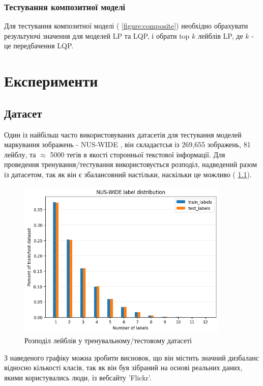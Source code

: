 \documentclass{udstu}
\begin{document}
\subsection{Тестування композитної моделі}

Для тестування композитної моделі (\figurename{ \ref{figure:composite}})
необхідно обрахувати результуючі значення для моделей LP та LQP, і обрати
top $k$ лейблів LP, де $k$ - це передбачення LQP.


\chapter{Експерименти}

\section{Датасет}

Один із найбільш часто використовуваних датасетів для тестування моделей маркування зображень - NUS-WIDE \cite{nus-wide-civr09},
він складаєтсья із 269,655 зображень, 81 лейблу, та $\approx$ 5000 тегів в якості сторонньої текстової інформації.
Для проведення тренування/тестування використовується розподіл, надведений разом із
датасетом, так як він є збалансовний настільки, наскільки це можливо (\figurename{ \ref{figure:nus-wide-dist}}).

\begin{figure}[!ht]
	\centering
	\includegraphics[width=0.9\textwidth]{PNG/nus-wide-label-dist}
	\caption{Розподіл лейблів у тренувальному/тестовому датасеті}
	\label{figure:nus-wide-dist}
\end{figure}

З наведеного графіку можна зробити висновок, що він містить значний дизбаланс відносно кількості класів,
так як він був зібраний на основі реальних даних, якими користувались люди, із вебсайту 'Flickr'.
\end{document}
